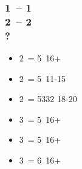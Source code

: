 \documentclass[12pt, a4paper]{report}
\begin{document}
{    \subsubsection*{1\spades\ -- 1\ntx\ \\ 2\clubs\ -- 2\diams \\ ?}
    \begin{itemize}
        \item 2\hearts\ = 5\hearts\ 16+
        \item 2\spades\ = 5\clubs\ 11-15
        \item 2\ntx\ = 5332 18-20
        \item 3\clubs\ = 5\clubs\ 16+
        \item 3\diams\ = 5\diams\ 16+
        \item 3\spades\ = 6\spades\ 16+
    \end{itemize}

}
\end{document}
